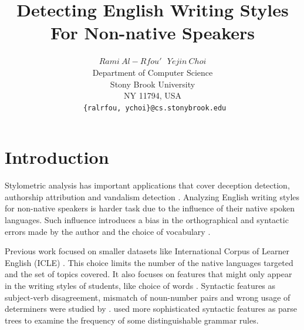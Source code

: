 \documentclass[10pt,a5paper,twoside]{article}
\title{Detecting English Writing Styles For Non-native Speakers}
\author{$Rami~Al-Rfou'~~~Yejin~Choi$ \\
  Department of Computer Science \\
  Stony Brook University \\
  NY 11794, USA \\
  \texttt{ \{ralrfou, ychoi\}@cs.stonybrook.edu}}
\begin{document}
\maketitle
{}


\newpage

\section{Introduction}
Stylometric analysis has important applications that cover deception detection,
authorship attribution and vandalism detection \cite{Harpalani, Ott}.
Analyzing English writing styles for non-native speakers is harder task due to the
influence of their native spoken languages.
Such influence introduces a bias in the orthographical and syntactic errors made by the author and the choice of vocabulary \cite{koppel2005automatically}.

Previous work focused on smaller datasets like {International Corpus of Learner English} (ICLE) \cite{koppel2005automatically, koppel2005determining, argamon2009automatically}. This choice limits the number of the native languages targeted and the set of topics covered.
It also focuses on features that might only appear in the writing styles of
students, like choice of words \cite{tsur2007using, zheng2003authorship,
gamon2004linguistic}. Syntactic features as subject-verb disagreement, mismatch
of noun-number pairs and wrong usage of determiners were studied by
\cite{wong2009contrastive}.
\cite{wong2010parser, wongdras2011EMNLP} used more sophisticated syntactic features as parse trees
to examine the frequency of some distinguishable grammar rules.
\end{document}
